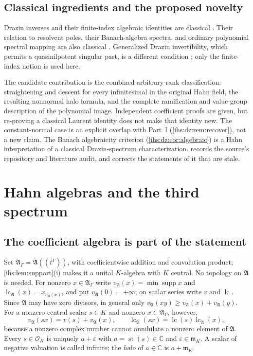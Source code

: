 \documentclass[11pt,a4paper]{article}
\numberwithin{equation}{section}
\theoremstyle{definition}
\theoremstyle{remark}
\newcommand{\C}{\mathbb C}
\newcommand{\K}{K}
\newcommand{\mK}{\mathfrak m_K}
\newcommand{\Ocal}{\mathcal O_K}
\newcommand{\supp}{\operatorname{supp}}
\newcommand{\st}{\operatorname{st}}
\newcommand{\eps}{\varepsilon}
\newcommand{\Alg}{\mathfrak A}
\newcommand{\AlgG}{\mathfrak A_\Gamma}
\newcommand{\lc}{\operatorname{lc}}
\begin{document}
\subsection{Classical ingredients and the proposed novelty}\label{ihs:dz:sec:novelty}
Drazin inverses and their finite-index algebraic identities are classical
\cite{Drazin}. Their relation to resolvent poles, their Banach-algebra
spectra, and ordinary polynomial spectral mapping are also classical
\cite{BoassoOperators,Boasso}. Generalized Drazin invertibility, which permits
a quasinilpotent singular part, is a different condition \cite{Koliha}; only
the finite-index notion is used here.

The candidate contribution is the combined arbitrary-rank classification:
straightening and descent for every infinitesimal in the original Hahn field,
the resulting nonnormal halo formula, and the complete ramification and
value-group description of the polynomial image. Independent coefficient
proofs are given, but re-proving a classical Laurent identity does not make
that identity new. The constant-normal case is an explicit overlap with
Part~I (\cref{ihs:dz:rem:recover}), not a new claim. The Banach algebraicity
criterion (\cref{ihs:dz:cor:algebraic}) is a Hahn interpretation of a
classical Drazin-spectrum characterization.  records the
source's repository and literature audit, and corrects the statements of it
that are stale.

\section{Hahn algebras and the third spectrum}\label{ihs:dz:sec:hahn}

\subsection{The coefficient algebra is part of the statement}\label{ihs:dz:sec:algebra}
Set $\AlgG=\Alg((t^\Gamma))$, with coefficientwise addition and convolution
product; \cref{ihs:lem:support}(i) makes it a unital $\K$-algebra with $\K$
central. No topology on $\Alg$ is needed. For nonzero $x\in\AlgG$ write
$v_\Alg(x)=\min\supp x$ and $\lc_\Alg(x)=x_{v_\Alg(x)}$, and put
$v_\Alg(0)=+\infty$; on scalar series write $v$ and $\lc$. Since $\Alg$ may
have zero divisors, in general only $v_\Alg(xy)\ge v_\Alg(x)+v_\Alg(y)$. For
a nonzero central scalar $s\in\K$ and nonzero $x\in\AlgG$, however,
\begin{equation}\label{ihs:dz:eq:scalarvaluation}
 v_\Alg(sx)=v(s)+v_\Alg(x),\qquad
 \lc_\Alg(sx)=\lc(s)\lc_\Alg(x),
\end{equation}
because a nonzero complex number cannot annihilate a nonzero element of
$\Alg$. Every $s\in\Ocal$ is uniquely $a+\eps$ with $a=\st(s)\in\C$ and
$\eps\in\mK$. A scalar of negative valuation is called infinite; the
\emph{halo} of $a\in\C$ is $a+\mK$.
\end{document}

